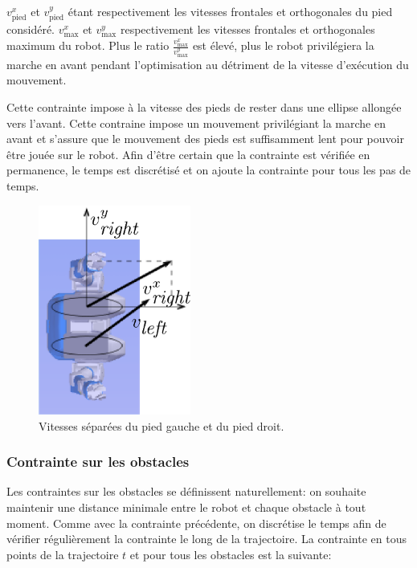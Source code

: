 $v_{\text{pied}}^{x}$ et $v_{\text{pied}}^{y}$ étant respectivement
les vitesses frontales et orthogonales du pied
considéré. $v_{\text{max}}^x$ et $v_{\text{max}}^y$ respectivement les
vitesses frontales et orthogonales maximum du robot. Plus le ratio
$\frac{v_{\text{max}}^x}{v_{\text{max}}^y}$ est élevé, plus le robot
privilégiera la marche en avant pendant l'optimisation au détriment de
la vitesse d'exécution du mouvement.

Cette contrainte impose à la vitesse des pieds de rester dans une
ellipse allongée vers l'avant. Cette contraine impose un mouvement
privilégiant la marche en avant et s'assure que le mouvement des pieds
est suffisamment lent pour pouvoir être jouée sur le robot. Afin
d'être certain que la contrainte est vérifiée en permanence, le temps
est discrétisé et on ajoute la contrainte pour tous les pas de temps.

\begin{figure}[htbp]
  \begin{center}
\includegraphics[width=5cm]{src/chap1-roboptim/speed-constraint-arrows.png}
  \end{center} \caption{Vitesses séparées du pied gauche et du pied
  droit. \label{fig:boxoptim}}
\end{figure}
\FloatBarrier


\subsubsection{Contrainte sur les obstacles}

Les contraintes sur les obstacles se définissent naturellement: on
souhaite maintenir une distance minimale entre le robot et chaque
obstacle à tout moment. Comme avec la contrainte précédente, on
discrétise le temps afin de vérifier régulièrement la contrainte le
long de la trajectoire. La contrainte en tous points de la trajectoire
$t$ et pour tous les obstacles est la suivante:

